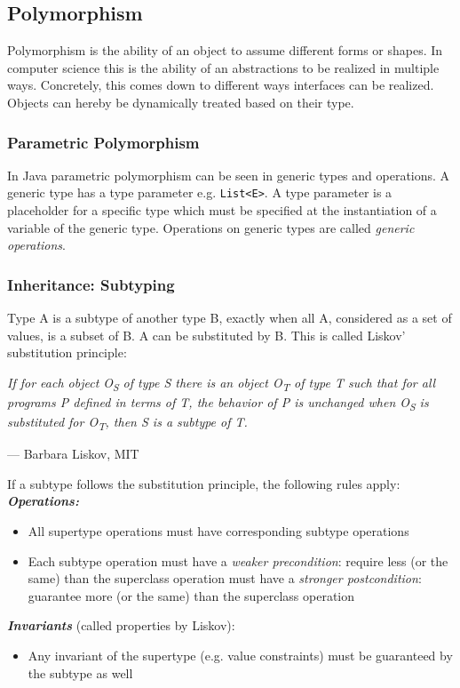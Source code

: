 \subsection{Polymorphism}
Polymorphism is the ability of an object to assume different forms or shapes.
In computer science this is the ability of an abstractions to be realized in multiple ways.
Concretely, this comes down to different ways interfaces can be realized.
Objects can hereby be dynamically treated based on their type.

\subsubsection*{Parametric Polymorphism}
In Java parametric polymorphism can be seen in generic types and operations.
A generic type has a type parameter e.g. \texttt{List<E>}.
A type parameter is a placeholder for a specific type which must be specified at the instantiation of a variable of the generic type.
Operations on generic types are called \textit{generic operations}.

\subsubsection*{Inheritance: Subtyping}
Type A is a subtype of another type B, exactly when all A, considered as a set of values, is a subset of B. A can be substituted by B. This is called Liskov' substitution principle:\newline

\textit{If for each object O\textsubscript{S} of type S there is an object O\textsubscript{T} of type T	such that for all programs P	defined in terms of T, the behavior	of P is unchanged when O\textsubscript{S} is	substituted for O\textsubscript{T}, then S is a subtype of T.}\newline
\begin{flushright}
	--- Barbara Liskov, MIT
\end{flushright}

If a subtype follows the substitution principle, the following rules apply:\newline
\textbf{\textit{Operations:}}
\begin{itemize}[topsep=5pt, itemsep=0pt]
	\item All supertype operations must have corresponding subtype
	operations
	\item Each subtype operation
	\subitem must have a \textit{weaker precondition}: require less (or the	same) than the superclass operation
	\subitem must have a \textit{stronger postcondition}: guarantee more (or the same) than the superclass operation
\end{itemize}
\textbf{\textit{Invariants}} (called properties by Liskov):
\begin{itemize}[topsep=5pt, itemsep=0pt]
	\item Any invariant of the supertype (e.g. value constraints) must be guaranteed by the subtype as well
\end{itemize}

